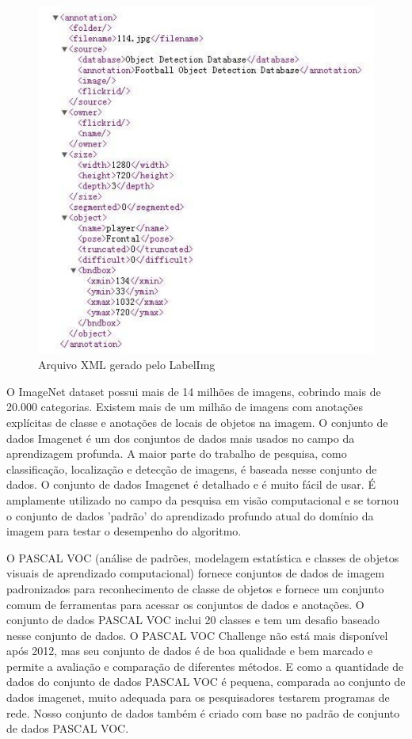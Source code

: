 \begin{figure}[htbp]
	\centering
	\includegraphics[width=0.8\linewidth]{figuras/MachineLearning/labelXml.png}
	\caption{Arquivo XML gerado pelo LabelImg}
	\label{fig:labelXml}
\end{figure}

O ImageNet dataset \cite{deng2009imagenet} possui mais de 14 milhões de imagens, cobrindo mais de 20.000 categorias. Existem mais de um milhão de imagens com anotações explícitas de classe e anotações de locais de objetos na imagem. O conjunto de dados Imagenet é um dos conjuntos de dados mais usados no campo da aprendizagem profunda. A maior parte do trabalho de pesquisa, como classificação, localização e detecção de imagens, é baseada nesse conjunto de dados. O conjunto de dados Imagenet é detalhado e é muito fácil de usar. É amplamente utilizado no campo da pesquisa em visão computacional e se tornou o conjunto de dados 'padrão' do aprendizado profundo atual do domínio da imagem para testar o desempenho do algoritmo. \cite{zhou2017application}

O PASCAL VOC (análise de padrões, modelagem estatística e classes de objetos visuais de aprendizado computacional) \cite{everingham2010pascal} fornece conjuntos de dados de imagem padronizados para reconhecimento de classe de objetos e fornece um conjunto comum de ferramentas para acessar os conjuntos de dados e anotações. O conjunto de dados PASCAL VOC inclui 20 classes e tem um desafio baseado nesse conjunto de dados. O PASCAL VOC Challenge \cite{everingham2010pascal} não está mais disponível após 2012, mas seu conjunto de dados é de boa qualidade e bem marcado e permite a avaliação e comparação de diferentes métodos. E como a quantidade de dados do conjunto de dados PASCAL VOC é pequena, comparada ao conjunto de dados imagenet, muito adequada para os pesquisadores testarem programas de rede. Nosso conjunto de dados também é criado com base no padrão de conjunto de dados PASCAL VOC.\cite{zhou2017application}


